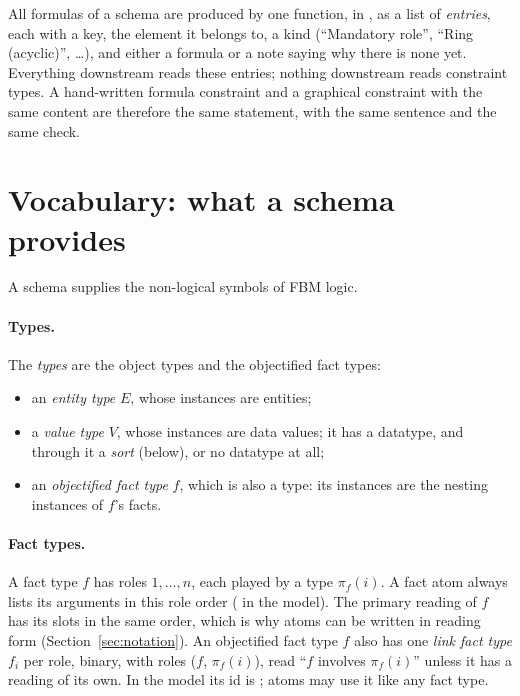 \documentclass[11pt, a4paper]{article}
\newcommand{\FBM}{FBM logic}
\begin{document}
All formulas of a schema are produced by one function, 
in , as a list of
\emph{entries}, each with a key, the element it belongs to, a kind
(``Mandatory role'', ``Ring (acyclic)'', \dots), and either a formula or a
note saying why there is none yet. Everything downstream reads these
entries; nothing downstream reads constraint types. A hand-written formula
constraint and a graphical constraint with the same content are therefore
the same statement, with the same sentence and the same check.

\section{Vocabulary: what a schema provides}
\label{sec:vocab}

A schema supplies the non-logical symbols of \FBM.

\paragraph{Types.} The \emph{types} are the object types and the
objectified fact types:
\begin{itemize}
  \item an \emph{entity type} $E$, whose instances are entities;
  \item a \emph{value type} $V$, whose instances are data values; it has a
        datatype, and through it a \emph{sort} (below), or no datatype at all;
  \item an \emph{objectified fact type} $f$, which is also a type: its
        instances are the nesting instances of $f$'s facts.
\end{itemize}

\paragraph{Fact types.} A fact type $f$ has roles $1,\dots,n$, each played
by a type $\pi_f(i)$. A fact atom always lists its arguments in this role
order ( in the model). The primary reading of $f$ has its
slots in the same order, which is why atoms can be written in reading form
(Section~\ref{sec:notation}). An objectified fact type $f$ also has one
\emph{link fact type} $f_i$ per role, binary, with roles ($f$, $\pi_f(i)$),
read ``$f$ involves $\pi_f(i)$'' unless it has a reading of its own. In the
model its id is ; atoms may use it like any fact
type.
\end{document}
